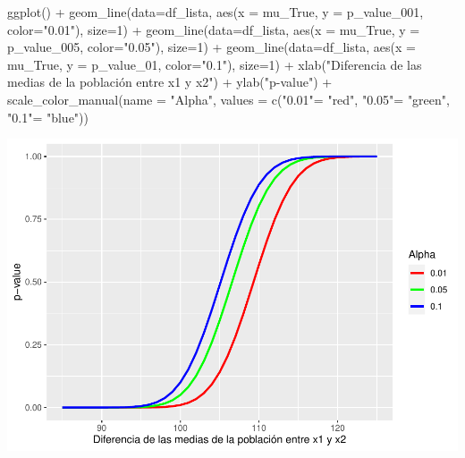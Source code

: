 \documentclass[]{article}
\newenvironment{Shaded}{\begin{snugshade}}{\end{snugshade}}
\newcommand{\AttributeTok}[1]{\textcolor[rgb]{0.77,0.63,0.00}{#1}}
\newcommand{\DecValTok}[1]{\textcolor[rgb]{0.00,0.00,0.81}{#1}}
\newcommand{\FunctionTok}[1]{\textcolor[rgb]{0.00,0.00,0.00}{#1}}
\newcommand{\NormalTok}[1]{#1}
\newcommand{\OtherTok}[1]{\textcolor[rgb]{0.56,0.35,0.01}{#1}}
\newcommand{\SpecialCharTok}[1]{\textcolor[rgb]{0.00,0.00,0.00}{#1}}
\newcommand{\StringTok}[1]{\textcolor[rgb]{0.31,0.60,0.02}{#1}}
\begin{document}
\begin{Shaded}
\begin{Highlighting}[]
\FunctionTok{ggplot}\NormalTok{() }\SpecialCharTok{+} 
    \FunctionTok{geom\_line}\NormalTok{(}\AttributeTok{data=}\NormalTok{df\_lista, }\FunctionTok{aes}\NormalTok{(}\AttributeTok{x =}\NormalTok{ mu\_True, }\AttributeTok{y =}\NormalTok{ p\_value\_001, }\AttributeTok{color=}\StringTok{"0.01"}\NormalTok{),   }\AttributeTok{size=}\DecValTok{1}\NormalTok{) }\SpecialCharTok{+}
  \FunctionTok{geom\_line}\NormalTok{(}\AttributeTok{data=}\NormalTok{df\_lista, }\FunctionTok{aes}\NormalTok{(}\AttributeTok{x =}\NormalTok{ mu\_True, }\AttributeTok{y =}\NormalTok{ p\_value\_005, }\AttributeTok{color=}\StringTok{"0.05"}\NormalTok{), }\AttributeTok{size=}\DecValTok{1}\NormalTok{) }\SpecialCharTok{+}
  \FunctionTok{geom\_line}\NormalTok{(}\AttributeTok{data=}\NormalTok{df\_lista, }\FunctionTok{aes}\NormalTok{(}\AttributeTok{x =}\NormalTok{ mu\_True, }\AttributeTok{y =}\NormalTok{ p\_value\_01,  }\AttributeTok{color=}\StringTok{"0.1"}\NormalTok{),  }\AttributeTok{size=}\DecValTok{1}\NormalTok{) }\SpecialCharTok{+} 
  \FunctionTok{xlab}\NormalTok{(}\StringTok{"Diferencia de las medias de la población entre x1 y x2"}\NormalTok{) }\SpecialCharTok{+}
  \FunctionTok{ylab}\NormalTok{(}\StringTok{"p{-}value"}\NormalTok{) }\SpecialCharTok{+}
  \FunctionTok{scale\_color\_manual}\NormalTok{(}\AttributeTok{name =} \StringTok{"Alpha"}\NormalTok{, }\AttributeTok{values =} \FunctionTok{c}\NormalTok{(}\StringTok{"0.01"}\OtherTok{=} \StringTok{"red"}\NormalTok{, }\StringTok{"0.05"}\OtherTok{=} \StringTok{"green"}\NormalTok{, }\StringTok{"0.1"}\OtherTok{=} \StringTok{"blue"}\NormalTok{))}
\end{Highlighting}
\end{Shaded}

\includegraphics{Enunciado_Tarea_3_files/figure-latex/unnamed-chunk-5-1.pdf}
\end{document}
